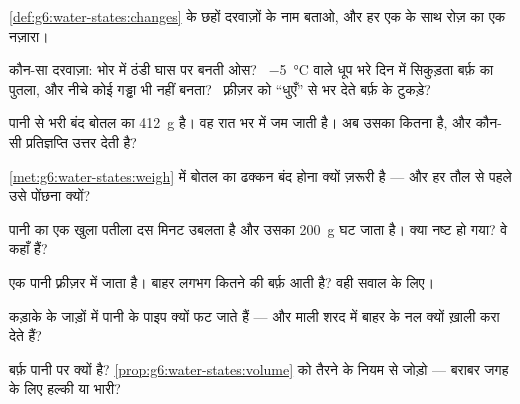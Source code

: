 \begin{exercise}[$\star$]\label{exo:g6:water-states:1}
\cref{def:g6:water-states:changes} के छहों दरवाज़ों के नाम बताओ, और
हर एक के साथ रोज़ का एक नज़ारा।
\end{exercise}

\begin{exercise}[$\star$]\label{exo:g6:water-states:2}
कौन-सा दरवाज़ा: भोर में ठंडी घास पर बनती ओस? \ \qty{-5}{\celsius}
वाले धूप भरे दिन में सिकुड़ता बर्फ़ का पुतला, और नीचे कोई गड्ढा भी नहीं
बनता? \ फ़्रीज़र को ``धुएँ'' से भर देते बर्फ़ के टुकड़े?
\end{exercise}

\begin{exercise}[$\star$]\label{exo:g6:water-states:3}
पानी से भरी बंद बोतल का  \qty{412}{g} है। वह रात भर में  जम
जाती है। अब उसका  कितना है, और कौन-सी प्रतिज्ञप्ति उत्तर देती है?
\end{exercise}

\begin{exercise}[$\star$]\label{exo:g6:water-states:4}
\cref{met:g6:water-states:weigh} में बोतल का ढक्कन बंद होना क्यों
ज़रूरी है --- और हर तौल से पहले उसे पोंछना क्यों?
\end{exercise}

\begin{exercise}[$\star$]\label{exo:g6:water-states:5}
पानी का एक खुला पतीला दस मिनट उबलता है और उसका  \qty{200}{g}
घट जाता है। क्या  नष्ट हो गया? वे  कहाँ हैं?
\end{exercise}

\begin{exercise}[$\star$]\label{exo:g6:water-states:6}
एक  पानी फ़्रीज़र में जाता है। बाहर लगभग कितने  की बर्फ़ आती
है? वही सवाल  के लिए।
\end{exercise}

\begin{exercise}[$\star$]\label{exo:g6:water-states:7}
कड़ाके के जाड़ों में पानी के पाइप क्यों फट जाते हैं --- और माली शरद
में बाहर के नल क्यों ख़ाली करा देते हैं?
\end{exercise}

\begin{exercise}[$\star$]\label{exo:g6:water-states:8}
बर्फ़ पानी पर क्यों  है? \cref{prop:g6:water-states:volume} को
तैरने के नियम से जोड़ो --- बराबर जगह के लिए हल्की या भारी?
\end{exercise}

